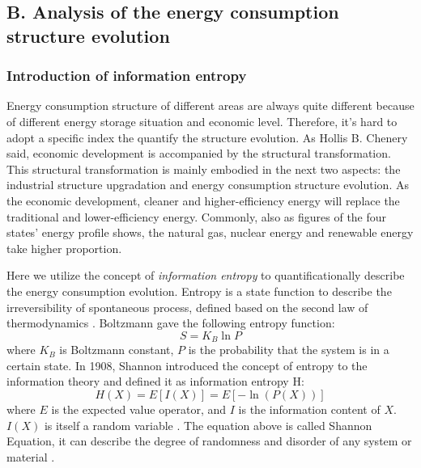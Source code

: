 
\subsection{B. Analysis of the energy consumption structure evolution}
\subsubsection{Introduction of information entropy}
Energy consumption structure of different areas are always quite different because of different energy storage situation and economic level. Therefore, it's hard to adopt a specific index the quantify the structure evolution. As Hollis B. Chenery said, economic development is accompanied by the structural transformation. This structural transformation is mainly embodied in the next two aspects: the industrial structure upgradation and energy consumption structure evolution. As the economic development, cleaner and higher-efficiency energy will replace the traditional and lower-efficiency energy. Commonly, also as figures of the four states' energy profile shows, the natural gas, nuclear energy and renewable energy take higher proportion.

Here we utilize the concept of \textit{information entropy} to quantificationally describe the energy consumption evolution. Entropy is a state function to describe the irreversibility of spontaneous process, defined based on the second law of thermodynamics \cite{gibbs1906scientific}. Boltzmann gave the following entropy function:
\begin{equation}
    S = K_B \ln{P}
\end{equation}
where $K_B$ is Boltzmann constant, $P$ is the probability that the system is in a certain state. In 1908, Shannon introduced the concept of entropy to the information theory and defined it as information entropy $\mathrm {H}$:
\begin{equation}
     H(X)= E [I(X)]= E [-\ln(P(X))]
    \label{equa: Shannon}
\end{equation}
where $E$ is the expected value operator, and $ {I}$ is the information content of $X$. $ {I}(X)$ is itself a random variable \cite{borda2011fundamentals}. The equation above is called Shannon Equation, it can describe the degree of randomness and disorder of any system or material \cite{Cai1998}.

